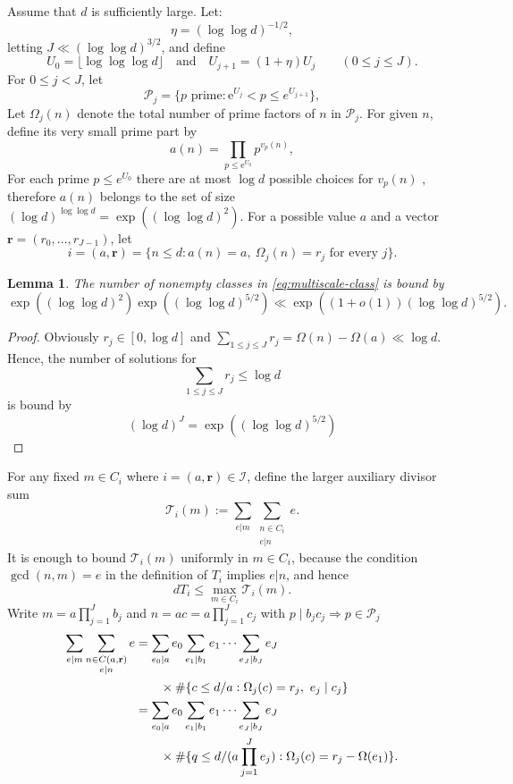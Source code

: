 \documentclass[11pt]{amsart}
\newtheorem{lem}[thm]{Lemma}
\theoremstyle{remark}
\begin{document}
Assume that $d$ is sufficiently large. Let:
\[
 \eta=(\log \log d)^{-1/2},
\]
letting $J \ll (\log \log d)^{3/2}$, and define
\[
 U_0=\lfloor \log \log \log d \rfloor \quad \text{and} \quad U_{j+1}=(1+\eta)U_j\qquad(0 \leq j \leq J).
\]
For $0\le j<J$, let
\begin{equation}
 \mathcal P_j=
 \{p\text{ prime}:\mathrm e^{U_j}<p\le
 e^{U_{j+1}}\},
\end{equation}
Let $\Omega_j(n)$ denote the total number of prime factors of $n$ in $\mathcal P_j$. For given $n$, define its very small prime part by
\begin{equation}
 a(n)=\prod_{p\le \mathrm e^{U_0}}p^{v_p(n)},
\end{equation}
For each prime $p \leq e^{U_0}$ there are at most $\log d$ possible choices for $v_p(n)$ , therefore $a(n)$ belongs to the set of size $(\log d)^{\log \log d} = \exp((\log \log d)^2)$. For a possible value $a$ and a vector
$\mathbf r=(r_0,\ldots,r_{J-1})$, let
\begin{equation}\label{eq:multiscale-class}
 i = (a,\mathbf r)=
 \{n\le d:a(n)=a,\ \Omega_j(n)=r_j\text{ for every }j\}.
\end{equation}

\begin{lem}
The number of nonempty classes in \eqref{eq:multiscale-class} is bound by
\[
\exp((\log \log d)^2) \exp((\log \log d)^{5/2}) \ll \exp((1 + o(1)) (\log \log d)^{5/2}).
\]
\end{lem}

\begin{proof}
Obviously $r_j \in [0, \log d]$ and $\sum_{1 \leq j \leq J}r_j = \Omega(n)-\Omega(a) \ll \log d$.
Hence, the number of solutions for 
\[
\sum_{1 \leq j \leq J}r_j \leq \log d
\]
is bound by 
\[
(\log d)^{J} = \exp((\log \log d)^{5/2})
\]
\end{proof}

For any fixed $m \in C_i$ where $i = (a, \mathbf{r}) \in \mathcal{I}$, define the larger auxiliary divisor sum
\[
\mathcal T_i(m):=\sum_{e | m} \sum_{\substack{n \in C_i \\ e | n }} e.
\]
It is enough to bound $\mathcal T_i(m)$ uniformly in $m\in C_i$, because the condition $\gcd(n,m)=e$ in the definition of $T_i$ implies $e|n$, and hence
\[
  dT_i\leq \max_{m\in C_i}\mathcal T_i(m).
\]
Write $m=a \prod_{j=1}^{J}b_j$ and $n=ac=a \prod_{j=1}^{J}c_j$ with $p \mid b_jc_j \Rightarrow p \in \mathcal P_j$
\begin{align}
\sum_{e | m} \sum_{\substack{n \in C(a,\mathbf r) \\ e | n }} e
&=\sum_{e_0 | a} e_0 \sum_{e_1 \mid b_1} e_1\cdots
  \sum_{e_J \mid b_J}e_J \notag\\
&\qquad{}\times
  \#\{c \leq d/a: \Omega_j(c)=r_j,\ e_j \mid c_j \} \notag\\
&=\sum_{e_0 | a} e_0 \sum_{e_1 \mid b_1} e_1\cdots
  \sum_{e_J \mid b_J}e_J \notag\\
&\qquad{}\times
  \#\{q \leq d/(a\prod_{j=1}^{J}e_j):
  \Omega_j(c)=r_j-\Omega(e_1) \}.
\end{align}
\end{document}
